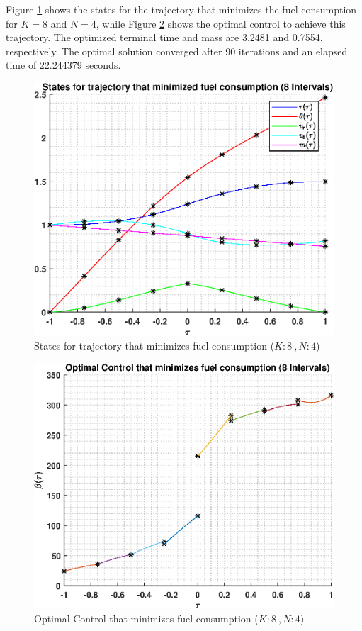 \documentclass[]{article}
\begin{document}
\vspace{2mm}\newline 
Figure \ref{fig:directStatesK8Poly4} shows the states for the trajectory that minimizes the fuel consumption for \(K = 8\) and  \(N = 4\), while Figure \ref{fig:directControlK8Poly4} shows the optimal control to achieve this trajectory. The optimized terminal time and mass are 3.2481 and 0.7554, respectively. The optimal solution converged after 90 iterations and an elapsed time of 22.244379 seconds.
\begin{figure}
	\centering
	\includegraphics[scale=0.75]{directStatesK8Poly4.eps}
	\caption{States for trajectory that minimizes fuel consumption (\(K:8\ , N:4\))}
	\label{fig:directStatesK8Poly4}
\end{figure}
\begin{figure}
	\centering
	\includegraphics[scale=0.75]{directControlK8Poly4.eps}
	\caption{Optimal Control that minimizes fuel consumption (\(K:8\ , N:4\))}
	\label{fig:directControlK8Poly4}
\end{figure}
\end{document}
